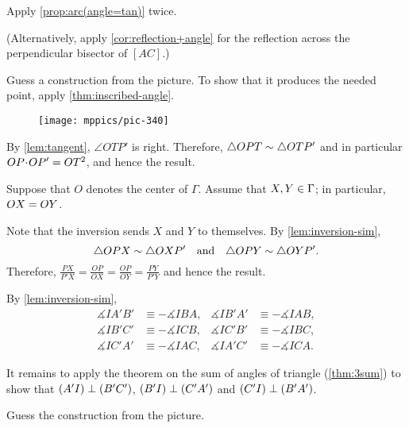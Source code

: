 Apply \ref{prop:arc(angle=tan)} twice.

(Alternatively, apply \ref{cor:reflection+angle} for the reflection across the perpendicular bisector of $[AC]$.)

 Guess a construction from the picture.
To show that it produces the needed point, apply \ref{thm:inscribed-angle}.


\begin{wrapfigure}[8]{r}{25mm}
\vskip-6mm
\centering
\texttt{[image: mppics/pic-340]}
\end{wrapfigure}

\setcounter{eqtn}{0}

By \ref{lem:tangent}, $\angle OTP'$ is right. 
Therefore, $\triangle OPT\sim \triangle OTP'$
and in particular
$OP\cdot OP'\z=OT^2$,
and hence the result.

Suppose that $O$ denotes the center of $\Gamma$.
Assume that $X,Y\in \Gamma$;
in particular, $OX=OY$.



Note that the inversion sends $X$ and $Y$ to themselves.
By \ref{lem:inversion-sim},
$$\triangle OPX\sim \triangle OXP'
\quad
\text{and}
\quad
\triangle OPY\sim \triangle OYP'.$$
Therefore, 
$\frac{PX}{P'X}=\frac{OP}{OX}=\frac{OP}{OY}=\frac{PY}{P'Y}$
and hence the result.

By \ref{lem:inversion-sim},
\begin{align*}
\measuredangle IA'B'&\equiv -\measuredangle IBA,
&
\measuredangle IB'A'&\equiv -\measuredangle IAB,
\\
\measuredangle IB'C'&\equiv -\measuredangle ICB,
&
\measuredangle IC'B'&\equiv -\measuredangle IBC,
\\
\measuredangle IC'A'&\equiv -\measuredangle IAC,
&
\measuredangle IA'C'&\equiv -\measuredangle ICA.
\end{align*}

It remains to apply the theorem on the sum of angles of triangle (\ref{thm:3sum})
to show that $(A'I)\perp (B'C')$, 
$(B'I)\perp (C'A')$
and
$(C'I)\perp (B'A')$.

Guess the construction from the picture.

